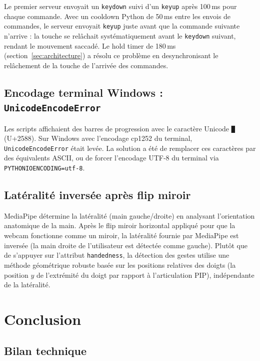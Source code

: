 \documentclass[12pt, a4paper]{article}
\newcommand{\code}[1]{\texttt{\small #1}}
\begin{document}
Le premier serveur envoyait un \code{keydown} suivi d'un \code{keyup} après
100\,ms pour chaque commande. Avec un cooldown Python de 50\,ms entre les
envois de commandes, le serveur envoyait \code{keyup} juste avant que la
commande suivante n'arrive : la touche se relâchait systématiquement avant
le \code{keydown} suivant, rendant le mouvement saccadé. Le hold timer de
180\,ms (section~\ref{sec:architecture}) a résolu ce problème en desynchronisant
le relâchement de la touche de l'arrivée des commandes.

\subsection{Encodage terminal Windows : \texttt{UnicodeEncodeError}}

Les scripts affichaient des barres de progression avec le caractère Unicode
\code{█} (U+2588). Sur Windows avec l'encodage cp1252 du terminal,
\code{UnicodeEncodeError} était levée. La solution a été de remplacer ces
caractères par des équivalents ASCII, ou de forcer l'encodage UTF-8 du
terminal via \code{PYTHONIOENCODING=utf-8}.

\subsection{Latéralité inversée après flip miroir}

MediaPipe détermine la latéralité (main gauche/droite) en analysant l'orientation
anatomique de la main. Après le flip miroir horizontal appliqué pour que la
webcam fonctionne comme un miroir, la latéralité fournie par MediaPipe est
inversée (la main droite de l'utilisateur est détectée comme gauche). Plutôt
que de s'appuyer sur l'attribut \code{handedness}, la détection des gestes
utilise une méthode géométrique robuste basée sur les positions relatives des
doigts (la position \(y\) de l'extrémité du doigt par rapport à l'articulation PIP),
indépendante de la latéralité.

\section{Conclusion}
\label{sec:conclusion}

\subsection{Bilan technique}
\end{document}
